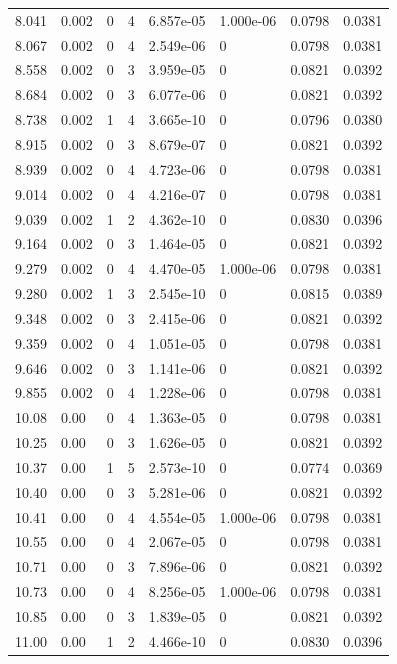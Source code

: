 \documentclass[preview]{standalone}
\begin{document}
{{{\begin{tabular}{L{1.2cm}C{1.2cm} C{0.3cm}C{0.5cm} C{1.4cm}C{1.4cm} C{1.4cm}C{1.4cm}}
  8.041  &  0.002  & 0     &  4 &  6.857e-05  & 1.000e-06  & 0.0798 &  0.0381   \\ 
  8.067  &  0.002  & 0     &  4 &  2.549e-06  & 0  & 0.0798 &  0.0381   \\ 
  8.558  &  0.002  & 0     &  3 &  3.959e-05  & 0  & 0.0821 &  0.0392   \\ 
  8.684  &  0.002  & 0     &  3 &  6.077e-06  & 0  & 0.0821 &  0.0392   \\ 
  8.738  &  0.002  & 1     &  4 &  3.665e-10  & 0  & 0.0796 &  0.0380   \\ 
  8.915  &  0.002  & 0     &  3 &  8.679e-07  & 0  & 0.0821 &  0.0392   \\ 
  8.939  &  0.002  & 0     &  4 &  4.723e-06  & 0  & 0.0798 &  0.0381   \\ 
  9.014  &  0.002  & 0     &  4 &  4.216e-07  & 0  & 0.0798 &  0.0381   \\ 
  9.039  &  0.002  & 1     &  2 &  4.362e-10  & 0  & 0.0830 &  0.0396   \\ 
  9.164  &  0.002  & 0     &  3 &  1.464e-05  & 0  & 0.0821 &  0.0392   \\ 
  9.279  &  0.002  & 0     &  4 &  4.470e-05  & 1.000e-06  & 0.0798 &  0.0381   \\ 
  9.280  &  0.002  & 1     &  3 &  2.545e-10  & 0  & 0.0815 &  0.0389   \\ 
  9.348  &  0.002  & 0     &  3 &  2.415e-06  & 0  & 0.0821 &  0.0392   \\ 
  9.359  &  0.002  & 0     &  4 &  1.051e-05  & 0  & 0.0798 &  0.0381   \\ 
  9.646  &  0.002  & 0     &  3 &  1.141e-06  & 0  & 0.0821 &  0.0392   \\ 
  9.855  &  0.002  & 0     &  4 &  1.228e-06  & 0  & 0.0798 &  0.0381   \\ 
  10.08  &  0.00  & 0     &  4 &  1.363e-05  & 0  & 0.0798 &  0.0381   \\ 
  10.25  &  0.00  & 0     &  3 &  1.626e-05  & 0  & 0.0821 &  0.0392   \\ 
  10.37  &  0.00  & 1     &  5 &  2.573e-10  & 0  & 0.0774 &  0.0369   \\ 
  10.40  &  0.00  & 0     &  3 &  5.281e-06  & 0  & 0.0821 &  0.0392   \\ 
  10.41  &  0.00  & 0     &  4 &  4.554e-05  & 1.000e-06  & 0.0798 &  0.0381   \\ 
  10.55  &  0.00  & 0     &  4 &  2.067e-05  & 0  & 0.0798 &  0.0381   \\ 
  10.71  &  0.00  & 0     &  3 &  7.896e-06  & 0  & 0.0821 &  0.0392   \\ 
  10.73  &  0.00  & 0     &  4 &  8.256e-05  & 1.000e-06  & 0.0798 &  0.0381   \\ 
  10.85  &  0.00  & 0     &  3 &  1.839e-05  & 0  & 0.0821 &  0.0392   \\ 
  11.00  &  0.00  & 1     &  2 &  4.466e-10  & 0  & 0.0830 &  0.0396   \\ 
\hline 
\end{tabular} 

}}}
\end{document}
